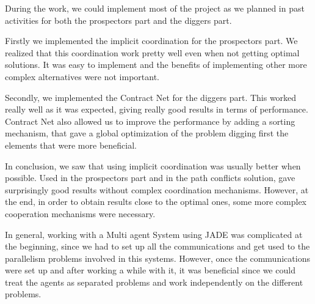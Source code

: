During the work, we could implement most of the project as we planned in past activities for both the prospectors part and the diggers part. 

Firstly we implemented the implicit coordination for the prospectors part. We realized that this coordination work pretty well even when not getting optimal solutions. It was easy to implement and the benefits of implementing other more complex alternatives were not important. 

Secondly, we implemented the Contract Net for the diggers part. This worked really well as it was expected, giving really good results in terms of performance. Contract Net also allowed us to improve the performance by adding a sorting mechanism, that gave a global optimization of the problem digging first the elements that were more beneficial. 

In conclusion, we saw that using implicit coordination was usually better when possible. Used in the prospectors part and in the path conflicts solution, gave surprisingly good results without complex coordination mechanisms. However, at the end, in order to obtain results close to the optimal ones, some more complex cooperation mechanisms were necessary. 

In general, working with a Multi agent System using JADE was complicated at the beginning, since we had to set up all the communications and get used to the parallelism problems involved in this systems. However, once the communications were set up and after working a while with it, it was beneficial since we could treat the agents as separated problems and work independently on the different problems.  